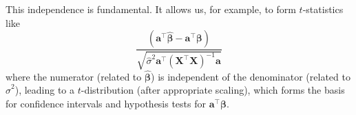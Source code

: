 \documentclass[11pt, letterpaper]{article}
\theoremstyle{plain} %
\theoremstyle{definition} %
\theoremstyle{remark} %
\begin{document}
This independence is fundamental. It allows us, for example, to form $t$-statistics like
\[ \frac{(\boldsymbol{a}^{\top}\hat{\boldsymbol{\beta}} - \boldsymbol{a}^{\top}\boldsymbol{\beta})}{\sqrt{\hat{\sigma}^2 \boldsymbol{a}^{\top}(\boldsymbol{X}^{\top}\boldsymbol{X})^{-1}\boldsymbol{a}}} \]
where the numerator (related to $\hat{\boldsymbol{\beta}}$) is independent of the denominator (related to $\hat{\sigma}^2$), leading to a $t$-distribution (after appropriate scaling), which forms the basis for confidence intervals and hypothesis tests for $\boldsymbol{a}^{\top}\boldsymbol{\beta}$.
\end{document}
